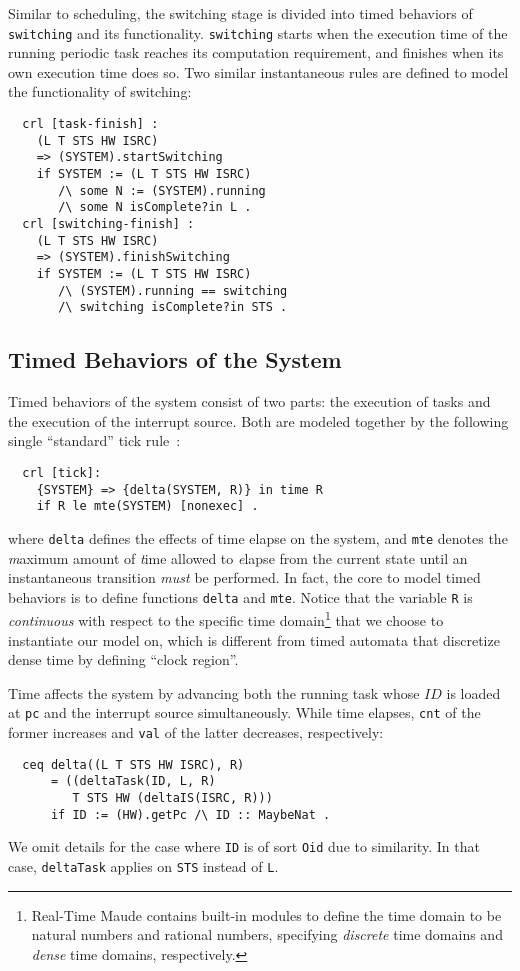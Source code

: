 \documentclass[10pt,journal]{IEEEtran}
\begin{document}
Similar to scheduling, the switching stage is divided into timed
behaviors of \verb|switching| and its functionality. \verb|switching|
starts when the execution time of the running periodic task reaches
its computation requirement, and finishes when its own execution time
does so. Two similar instantaneous rules are defined to model the
functionality of switching:
\begin{verbatim}
  crl [task-finish] :
    (L T STS HW ISRC) 
    => (SYSTEM).startSwitching
    if SYSTEM := (L T STS HW ISRC)
       /\ some N := (SYSTEM).running
       /\ some N isComplete?in L .
  crl [switching-finish] :
    (L T STS HW ISRC) 
    => (SYSTEM).finishSwitching
    if SYSTEM := (L T STS HW ISRC)
       /\ (SYSTEM).running == switching
       /\ switching isComplete?in STS .
\end{verbatim}

\subsection{Timed Behaviors of the System}
\label{ss:timedbehavior}
Timed behaviors of the system consist of two parts: the execution of
tasks and the execution of the interrupt source. Both are modeled
together by the following single ``standard'' tick
rule~\cite{DBLP:journals/entcs/OlveczkyM07a}:
\begin{verbatim}
  crl [tick]:
    {SYSTEM} => {delta(SYSTEM, R)} in time R 
    if R le mte(SYSTEM) [nonexec] .
\end{verbatim}
where \verb|delta| defines the effects of time elapse on the system,
and \verb|mte| denotes the \emph{m}aximum amount of \emph{t}ime
allowed to \emph{e}lapse from the current state until an instantaneous
transition \emph{must} be performed. In fact, the core to model timed
behaviors is to define functions \verb|delta| and \verb|mte|. Notice
that the variable \verb|R| is \emph{continuous} with respect to the
specific time domain\footnote{Real-Time Maude contains built-in
  modules to define the time domain to be natural numbers and rational
  numbers, specifying \emph{discrete} time domains and \emph{dense}
  time domains, respectively.}  that we choose to instantiate our
model on, which is different from timed automata that discretize dense
time by defining ``clock region''.

Time affects the system by advancing both the running task whose $ID$
is loaded at \verb|pc| and the interrupt source simultaneously.  While
time elapses, \verb|cnt| of the former increases and \verb|val| of the
latter decreases, respectively:
\begin{verbatim}
  ceq delta((L T STS HW ISRC), R)
      = ((deltaTask(ID, L, R) 
         T STS HW (deltaIS(ISRC, R)))
      if ID := (HW).getPc /\ ID :: MaybeNat .
\end{verbatim}
We omit details for the case where \verb|ID| is of sort \verb|Oid| due
to similarity. In that case, \verb|deltaTask| applies on \verb|STS|
instead of \verb|L|.
\end{document}
